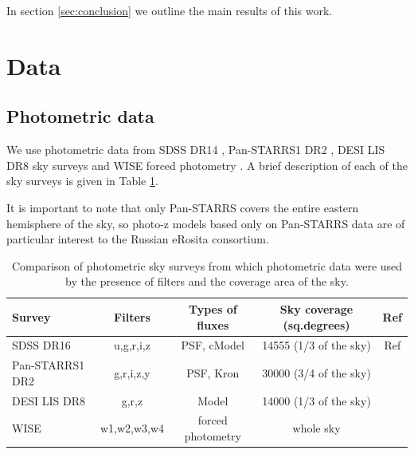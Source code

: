 \documentclass[fleqn,usenatbib]{mnras}
\begin{document}
In section \ref{sec:conclusion} we outline the main results of this work.


\section{Data}\label{sec:data}
\subsection{Photometric data}
We use photometric data from SDSS DR14 \citep{2018ApJS..235...42A}, Pan-STARRS1 DR2 \citep{2018AAS...23110201C}, DESI LIS DR8 \citep{2019AJ....157..168D} sky surveys and WISE forced photometry \citep{2010AJ....140.1868W}. A brief description of each of the sky surveys is given in Table \ref{tab:catalogs_comparison}.

It is important to note that only Pan-STARRS covers the entire eastern hemisphere of the sky, so photo-z models based only on Pan-STARRS data are of particular interest to the Russian eRosita consortium.

\begin{table}
    \caption{Comparison of photometric sky surveys from which photometric data were used by the presence of filters and the coverage area of the sky.}
    \label{tab:catalogs_comparison}
    \centering
    \begin{tabular}{|l|c|c|c|c|}
    \hline
        Survey & Filters & Types of fluxes & Sky coverage (sq.degrees) & Ref \\
    \hline
        SDSS DR16 & u,g,r,i,z & PSF, cModel & 14555 (1/3 of the sky) & Ref\\
        Pan-STARRS1 DR2 & g,r,i,z,y & PSF, Kron & 30000 (3/4 of the sky) & \\
        DESI LIS DR8 & g,r,z & Model & 14000 (1/3 of the sky) & \\
        WISE & w1,w2,w3,w4 & forced photometry & whole sky & \\[1ex]
        \hline
    \end{tabular}
\end{table}
\end{document}
